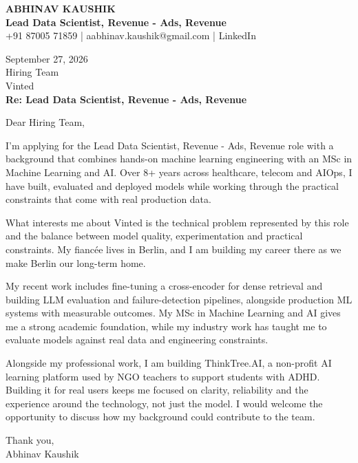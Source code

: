 \documentclass[10pt,a4paper]{article}
\begin{document}
\begin{center}
{\Large\bfseries ABHINAV KAUSHIK}\\[2pt]
{\bfseries Lead Data Scientist, Revenue - Ads, Revenue}\\[2pt]
+91 87005 71859 \quad | \quad aabhinav.kaushik@gmail.com \quad | \quad LinkedIn
\end{center}
\vspace{8pt}
September 27, 2026\\[6pt]
Hiring Team\\
Vinted\\[4pt]
\textbf{Re: Lead Data Scientist, Revenue - Ads, Revenue}

Dear Hiring Team,

I’m applying for the Lead Data Scientist, Revenue - Ads, Revenue role with a background that combines hands-on machine learning engineering with an MSc in Machine Learning and AI. Over 8+ years across healthcare, telecom and AIOps, I have built, evaluated and deployed models while working through the practical constraints that come with real production data.

What interests me about Vinted is the technical problem represented by this role and the balance between model quality, experimentation and practical constraints. My fiancée lives in Berlin, and I am building my career there as we make Berlin our long-term home.

My recent work includes fine-tuning a cross-encoder for dense retrieval and building LLM evaluation and failure-detection pipelines, alongside production ML systems with measurable outcomes. My MSc in Machine Learning and AI gives me a strong academic foundation, while my industry work has taught me to evaluate models against real data and engineering constraints.

Alongside my professional work, I am building ThinkTree.AI, a non-profit AI learning platform used by NGO teachers to support students with ADHD. Building it for real users keeps me focused on clarity, reliability and the experience around the technology, not just the model. I would welcome the opportunity to discuss how my background could contribute to the team.

Thank you,\\
Abhinav Kaushik
\end{document}
